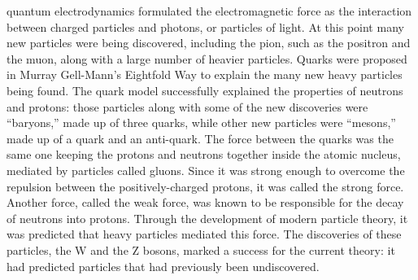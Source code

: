 quantum electrodynamics formulated the electromagnetic force 
as the interaction between charged particles and photons, 
or particles of light.  
At this point many new particles were being discovered, 
including the pion, 
such 
as the positron and the muon, 
along with a large number of heavier particles.  
Quarks were proposed in Murray Gell-Mann's Eightfold Way 
to explain the many new heavy particles 
being found. %
The quark model successfully explained the 
properties of neutrons and protons: 
those particles along with some of the new discoveries 
were ``baryons,'' made up of three quarks, 
while other new particles were ``mesons,'' 
made up of a quark and an anti-quark.  
The force between the quarks was the same one 
keeping the protons and neutrons together inside the 
atomic nucleus, 
mediated by particles called gluons.  
Since it was strong enough to overcome the repulsion 
between the positively-charged protons, 
it was called the strong force.  
Another force, called the weak force, 
was known to be responsible for the decay of 
neutrons into protons.  
Through the development of modern particle theory, 
it was predicted that heavy particles mediated this force.  
The discoveries of these particles, the W and the Z bosons, 
marked a success for the current theory: 
it had predicted particles that had previously been 
undiscovered.  

